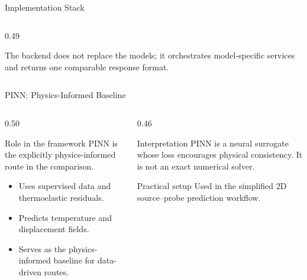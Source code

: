 \documentclass[aspectratio=169,10pt]{beamer}
\begin{document}
\begin{frame}{Implementation Stack}
\begin{columns}[T,onlytextwidth]
\begin{column}{0.49\textwidth}
{}
      \vspace{2mm}

      {\scriptsize The backend does not replace the models; it orchestrates
      model-specific services and returns one comparable response format.}
    \end{column}
  \end{columns}
\end{frame}

\begin{frame}{PINN: Physics-Informed Baseline}
  \begin{columns}[T]
    \begin{column}{0.50\textwidth}
      \begin{block}{Role in the framework}
        \footnotesize
        PINN is the explicitly physics-informed route in the comparison.
      \end{block}
      \begin{itemize}
        \footnotesize
        \item Uses supervised data and thermoelastic residuals.
        \item Predicts temperature and displacement fields.
        \item Serves as the physics-informed baseline for data-driven routes.
      \end{itemize}
    \end{column}
    \begin{column}{0.46\textwidth}
      \begin{alertblock}{Interpretation}
        \footnotesize
        PINN is a neural surrogate whose loss encourages physical consistency.
        It is not an exact numerical solver.
      \end{alertblock}
      \begin{block}{Practical setup}
        \footnotesize
        Used in the simplified 2D source--probe prediction workflow.
      \end{block}
    \end{column}
  \end{columns}
\end{frame}
\end{document}
